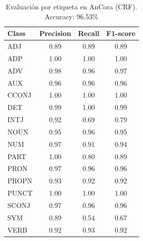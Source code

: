 \begin{table}[H]
\centering
\small
\begin{tabular}{lccc}
\hline
\textbf{Class} & \textbf{Precision} & \textbf{Recall} & \textbf{F1-score} \\
\hline
ADJ   & 0.89 & 0.89 & 0.89 \\
ADP   & 1.00 & 1.00 & 1.00 \\
ADV   & 0.98 & 0.96 & 0.97 \\
AUX   & 0.96 & 0.96 & 0.96 \\
CCONJ & 1.00 & 1.00 & 1.00 \\
DET   & 0.99 & 1.00 & 0.99 \\
INTJ  & 0.92 & 0.69 & 0.79 \\
NOUN  & 0.95 & 0.96 & 0.95 \\
NUM   & 0.97 & 0.91 & 0.94 \\
PART  & 1.00 & 0.80 & 0.89 \\
PRON  & 0.97 & 0.96 & 0.96 \\
PROPN & 0.93 & 0.92 & 0.92 \\
PUNCT & 1.00 & 1.00 & 1.00 \\
SCONJ & 0.97 & 0.96 & 0.96 \\
SYM   & 0.89 & 0.54 & 0.67 \\
VERB  & 0.92 & 0.93 & 0.92 \\
\hline
\end{tabular}
\caption{Evaluación por etiqueta en AnCora (CRF). Accuracy: 96.53\%}
\end{table}